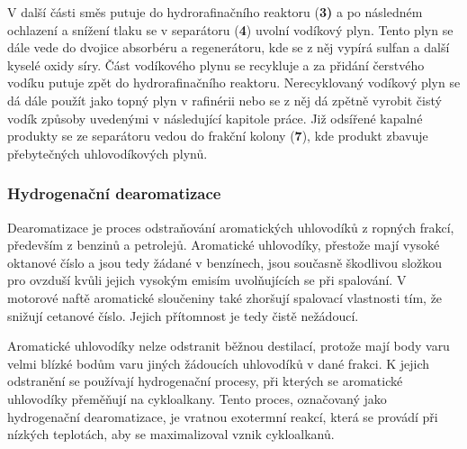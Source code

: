 \noindent
V další části směs putuje do hydrorafinačního reaktoru (\textbf{3)} a po následném ochlazení a snížení tlaku se v separátoru (\textbf{4}) uvolní vodíkový plyn. Tento plyn se dále vede do dvojice absorbéru a regenerátoru, kde se z něj vypírá sulfan a další kyselé oxidy síry. Část vodíkového plynu se recykluje a za přidání čerstvého vodíku putuje zpět do hydrorafinačního reaktoru. Nerecyklovaný vodíkový plyn se dá dále použít jako topný plyn v rafinérii nebo se z něj dá zpětně vyrobit čistý vodík způsoby uvedenými v následující kapitole práce. Již odsířené kapalné produkty se ze separátoru vedou do frakční kolony (\textbf{7}), kde produkt zbavuje přebytečných uhlovodíkových plynů. \cite{Blazek2006}

\subsubsection{Hydrogenační dearomatizace}

Dearomatizace je proces odstraňování aromatických uhlovodíků z ropných frakcí, především z benzinů a petrolejů. Aromatické uhlovodíky, přestože mají vysoké oktanové číslo a jsou tedy žádané v benzínech, jsou současně škodlivou složkou pro ovzduší kvůli jejich vysokým emisím uvolňujících se při spalování. V motorové naftě aromatické sloučeniny také zhoršují spalovací vlastnosti tím, že snižují cetanové číslo. Jejich přítomnost je tedy čistě nežádoucí. \cite{Blazek2006}

Aromatické uhlovodíky nelze odstranit běžnou destilací, protože mají body varu velmi blízké bodům varu jiných žádoucích uhlovodíků v dané frakci. K jejich odstranění se používají hydrogenační procesy, při kterých se aromatické uhlovodíky přeměňují na cykloalkany. Tento proces, označovaný jako hydrogenační dearomatizace, je vratnou exotermní reakcí, která se provádí při nízkých teplotách, aby se maximalizoval vznik cykloalkanů. \cite{Blazek2006}

